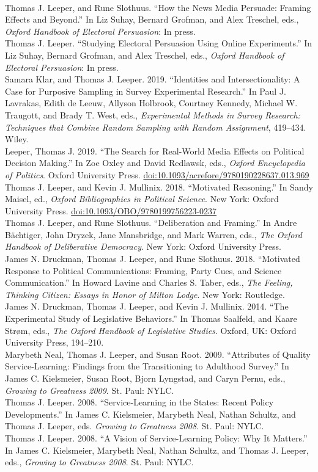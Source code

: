 \documentclass[12pt]{article}
\newcommand{\topic}[1]{\pagebreak[3]\indent {\color{lg}{\footnotesize #1 }}\\}
\newcommand{\entry}[1]{\indent {\color{lg}\guillemotright}\hspace{2pt}#1\vspace{.25em}\\}
\begin{document}
\topic{Chapters in Edited Volumes}
	\entry{Thomas J. Leeper, and Rune Slothuus. ``How the News Media Persuade: Framing Effects and Beyond.'' In Liz Suhay, Bernard Grofman, and Alex Treschel, eds., \textit{Oxford Handbook of Electoral Persuasion}: In press.}
    \entry{Thomas J. Leeper. ``Studying Electoral Persuasion Using Online Experiments.'' In Liz Suhay, Bernard Grofman, and Alex Treschel, eds., \textit{Oxford Handbook of Electoral Persuasion}: In press.}
   	\entry{Samara Klar, and Thomas J. Leeper. 2019. ``Identities and Intersectionality: A Case for Purposive Sampling in Survey Experimental Research.'' In Paul J. Lavrakas, Edith de Leeuw, Allyson Holbrook, Courtney Kennedy, Michael W. Traugott, and Brady T. West, eds., \textit{Experimental Methods in Survey Research: Techniques that Combine Random Sampling with Random Assignment}, 419--434. Wiley.}
    \entry{Leeper, Thomas J. 2019. ``The Search for Real-World Media Effects on Political Decision Making.'' In Zoe Oxley and David Redlawsk, eds., \textit{Oxford Encyclopedia of Politics}. Oxford University Press. \href{https://doi.org/10.1093/acrefore/9780190228637.013.969}{doi:10.1093/acrefore/9780190228637.013.969}}    	
    \entry{Thomas J. Leeper, and Kevin J. Mullinix. 2018. ``Motivated Reasoning.'' In Sandy Maisel, ed., \textit{Oxford Bibliographies in Political Science}. New York: Oxford University Press. \href{https://doi.org/10.1093/OBO/9780199756223-0237}{doi:10.1093/OBO/9780199756223-0237}}
    \entry{Thomas J. Leeper, and Rune Slothuus. ``Deliberation and Framing.'' In Andre B{\"a}chtiger, John Dryzek, Jane Mansbridge, and Mark Warren, eds., \textit{The Oxford Handbook of Deliberative Democracy}. New York: Oxford University Press.}
	\entry{James N. Druckman, Thomas J. Leeper, and Rune Slothuus. 2018. ``Motivated Response to Political Communications: Framing, Party Cues, and Science Communication.'' In Howard Lavine and Charles S. Taber, eds., \textit{The Feeling, Thinking Citizen: Essays in Honor of Milton Lodge}. New York: Routledge.}
    \entry{James N. Druckman, Thomas J. Leeper, and Kevin J. Mullinix. 2014. ``The Experimental Study of Legislative Behaviors.'' In Thomas Saalfeld, and Kaare Str\o m, eds., \textit{The Oxford Handbook of Legislative Studies}. Oxford, UK: Oxford University Press, 194--210.}
	\entry{Marybeth Neal, Thomas J. Leeper, and Susan Root. 2009. ``Attributes of Quality Service-Learning: Findings from the Transitioning to Adulthood Survey.'' In James C. Kielsmeier, Susan Root, Bjorn Lyngstad, and Caryn Pernu, eds., \textit{Growing to Greatness 2009}. St. Paul: NYLC.}
	\entry{Thomas J. Leeper. 2008. ``Service-Learning in the States: Recent Policy Developments.'' In James C. Kielsmeier, Marybeth Neal, Nathan Schultz, and Thomas J. Leeper, eds. \textit{Growing to Greatness 2008}. St. Paul: NYLC.}
	\entry{Thomas J. Leeper. 2008. ``A Vision of Service-Learning Policy: Why It Matters.'' In James C. Kielsmeier, Marybeth Neal, Nathan Schultz, and Thomas J. Leeper, eds., \textit{Growing to Greatness 2008}. St. Paul: NYLC.}
\end{document}
